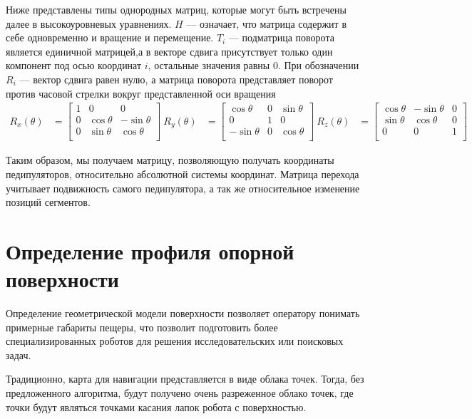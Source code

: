     Ниже представлены типы однородных матриц, которые могут быть встречены далее в высокоуровневых уравнениях. $H$ --- означает, что матрица содержит в себе одновременно и вращение и перемещение. $T_i$ --- подматрица поворота является единичной матрицей,а в векторе сдвига присутствует только один компонент под осью координат $i$, остальные значения равны $0$. При обозначении $R_i$ --- вектор сдвига равен нулю, а матрица поворота представляет поворот против часовой стрелки вокруг представленной оси вращения ${\displaystyle {\begin{alignedat}{1}R_{x}(\theta )&={\begin{bmatrix}1&0&0\\0&\cos \theta &-\sin \theta \\[3pt]0&\sin \theta &\cos \theta \\[3pt]\end{bmatrix}}\ R_{y}(\theta )&={\begin{bmatrix}\cos \theta &0&\sin \theta \\[3pt]0&1&0\\[3pt]-\sin \theta &0&\cos \theta \\\end{bmatrix}}\ R_{z}(\theta )&={\begin{bmatrix}\cos \theta &-\sin \theta &0\\[3pt]\sin \theta &\cos \theta &0\\[3pt]0&0&1\\\end{bmatrix}}\end{alignedat}}}$

    Таким образом, мы получаем матрицу, позволяющую получать координаты педипуляторов, относительно абсолютной системы координат. Матрица перехода учитывает подвижность самого педипулятора, а так же относительное изменение позиций сегментов.

\section{Определение профиля опорной поверхности}
Определение геометрической модели поверхности позволяет оператору понимать примерные габариты пещеры, что позволит подготовить более специализированных роботов для решения исследовательских или поисковых задач.

Традиционно, карта для навигации представляется в виде облака точек. Тогда, без предложенного алгоритма, будут получено очень разреженное облако точек, где точки будут являться точками касания лапок робота с поверхностью.

